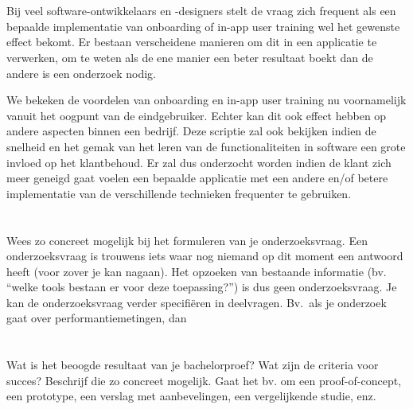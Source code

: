 \section{}
\label{sec:probleemstelling}

Bij veel software-ontwikkelaars en -designers stelt de vraag zich frequent als een bepaalde implementatie van onboarding of in-app user training wel het gewenste effect bekomt. Er bestaan verscheidene manieren om dit in een applicatie te verwerken, om te weten als de ene manier een beter resultaat boekt dan de andere is een onderzoek nodig.

We bekeken de voordelen van onboarding en in-app user training nu voornamelijk vanuit het oogpunt van de eindgebruiker. Echter kan dit ook effect hebben op andere aspecten binnen een bedrijf. Deze scriptie zal ook bekijken indien de snelheid en het gemak van het leren van de functionaliteiten in software een grote invloed op het klantbehoud. Er zal dus onderzocht worden indien de klant zich meer geneigd gaat voelen een bepaalde applicatie met een andere en/of betere implementatie van de verschillende technieken frequenter te gebruiken.

\section{}
\label{sec:onderzoeksvraag}

Wees zo concreet mogelijk bij het formuleren van je onderzoeksvraag. Een onderzoeksvraag is trouwens iets waar nog niemand op dit moment een antwoord heeft (voor zover je kan nagaan). Het opzoeken van bestaande informatie (bv. ``welke tools bestaan er voor deze toepassing?'') is dus geen onderzoeksvraag. Je kan de onderzoeksvraag verder specifiëren in deelvragen. Bv.~als je onderzoek gaat over performantiemetingen, dan 

\section{}
\label{sec:onderzoeksdoelstelling}

Wat is het beoogde resultaat van je bachelorproef? Wat zijn de criteria voor succes? Beschrijf die zo concreet mogelijk. Gaat het bv. om een proof-of-concept, een prototype, een verslag met aanbevelingen, een vergelijkende studie, enz.

